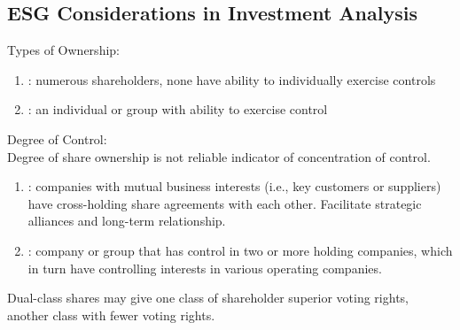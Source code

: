 \subsection{ESG Considerations in Investment Analysis}

\begin{definition} Types of Ownership:
\begin{enumerate}[label=\roman*.]
\setlength{\itemsep}{0pt}
\item {}: numerous shareholders, none have ability to individually exercise controls
\item {}: an individual or group with ability to exercise control
\end{enumerate}
\end{definition}

\begin{remark} Degree of Control:\\
Degree of share ownership is not reliable indicator of concentration of control.
\begin{enumerate}[label=\roman*.]
\setlength{\itemsep}{0pt}
\item {}: companies with mutual business interests (i.e., key customers or suppliers) have cross-holding share agreements with each other. Facilitate strategic alliances and long-term relationship.
\item {}: company or group that has control in two or more holding companies, which in turn have controlling interests in various operating companies.
\end{enumerate}
Dual-class shares may give one class of shareholder superior voting rights, another class with fewer voting rights.
\end{remark}

